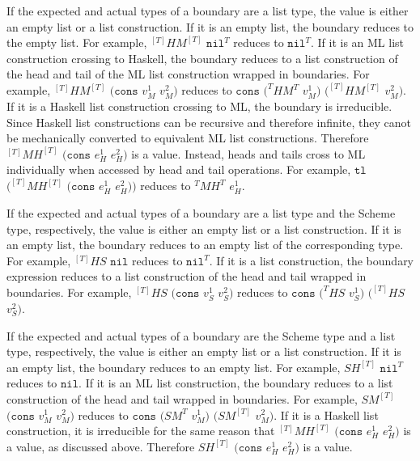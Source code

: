 If the expected and actual types of a boundary are a list type, the value is either an empty list or a list construction.  If it is an empty list, the boundary reduces to the empty list.  For example, $^{[T]}HM^{[T]}$ $\mathtt{nil}^{T}$ reduces to $\mathtt{nil}^{T}$.  If it is an ML list construction crossing to Haskell, the boundary reduces to a list construction of the head and tail of the ML list construction wrapped in boundaries.  For example, $^{[T]}HM^{[T]}$ $(\mathtt{cons}$ $v_{M}^{1}$ $v_{M}^{2})$ reduces to $\mathtt{cons}$ $(^{T}HM^{T}$ $v_{M}^{1})$ $(^{[T]}HM^{[T]}$ $v_{M}^{2})$.  If it is a Haskell list construction crossing to ML, the boundary is irreducible.  Since Haskell list constructions can be recursive and therefore infinite, they canot be mechanically converted to equivalent ML list constructions.  Therefore $^{[T]}MH^{[T]}$ $(\mathtt{cons}$ $e_{H}^{1}$ $e_{H}^{2})$ is a value.  Instead, heads and tails cross to ML individually when accessed by head and tail operations.  For example, $\mathtt{tl}$ $(^{[T]}MH^{[T]}$ $(\mathtt{cons}$ $e_{H}^{1}$ $e_{H}^{2}))$ reduces to $^{T}MH^{T}$ $e_{H}^{1}$.

If the expected and actual types of a boundary are a list type and the Scheme type, respectively, the value is either an empty list or a list construction.  If it is an empty list, the boundary reduces to an empty list of the corresponding type.  For example, $^{[T]}HS$ $\mathtt{nil}$ reduces to $\mathtt{nil}^{T}$.  If it is a list construction, the boundary expression reduces to a list construction of the head and tail wrapped in boundaries.  For example, $^{[T]}HS$ $(\mathtt{cons}$ $v_{S}^{1}$ $v_{S}^{2})$ reduces to $\mathtt{cons}$ $(^{T}HS$ $v_{S}^{1})$ $(^{[T]}HS$ $v_{S}^{2})$.

If the expected and actual types of a boundary are the Scheme type and a list type, respectively, the value is either an empty list or a list construction.  If it is an empty list, the boundary reduces to an empty list.  For example, $SH^{[T]}$ $\mathtt{nil}^{T}$ reduces to $\mathtt{nil}$.  If it is an ML list construction, the boundary reduces to a list construction of the head and tail wrapped in boundaries.  For example, $SM^{[T]}$ $(\mathtt{cons}$ $v_{M}^{1}$ $v_{M}^{2})$ reduces to $\mathtt{cons}$ $(SM^{T}$ $v_{M}^{1})$ $(SM^{[T]}$ $v_{M}^{2})$.  If it is a Haskell list construction, it is irreducible for the same reason that $^{[T]}MH^{[T]}$ $(\mathtt{cons}$ $e_{H}^{1}$ $e_{H}^{2})$ is a value, as discussed above.  Therefore $SH^{[T]}$ $(\mathtt{cons}$ $e_{H}^{1}$ $e_{H}^{2})$ is a value.









